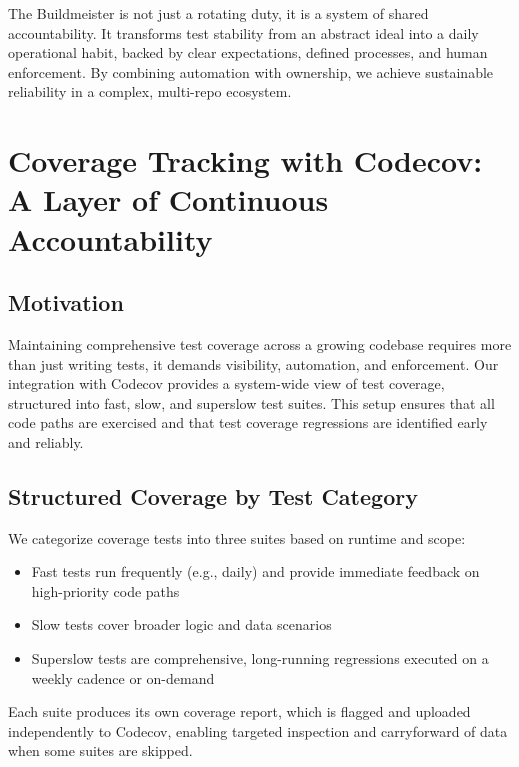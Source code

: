 \documentclass{article}
\begin{document}
The Buildmeister is not just a rotating duty, it is a system of shared accountability.
It transforms test stability from an abstract ideal into a daily operational
habit, backed by clear expectations, defined processes, and human enforcement.
By combining automation with ownership, we achieve sustainable reliability in a complex,
multi-repo ecosystem.

\section{Coverage Tracking with Codecov: A Layer of Continuous Accountability}
\label{coverage-tracking-with-codecov-a-layer-of-continuous-accountability}

\subsection{Motivation}
\label{motivation-1}

Maintaining comprehensive test coverage across a growing codebase requires more
than just writing tests, it demands visibility, automation, and enforcement. Our
integration with Codecov provides a system-wide view of test coverage, structured
into fast, slow, and superslow test suites. This setup ensures that all code
paths are exercised and that test coverage regressions are identified early and
reliably.

\subsection{Structured Coverage by Test Category}
\label{structured-coverage-by-test-category}

We categorize coverage tests into three suites based on runtime and scope:

\begin{itemize}

  \item Fast tests run frequently (e.g., daily) and provide immediate feedback on
    high-priority code paths

  \item Slow tests cover broader logic and data scenarios

  \item Superslow tests are comprehensive, long-running regressions executed on
    a weekly cadence or on-demand
\end{itemize}

Each suite produces its own coverage report, which is flagged and uploaded independently
to Codecov, enabling targeted inspection and carryforward of data when some
suites are skipped.
\end{document}
